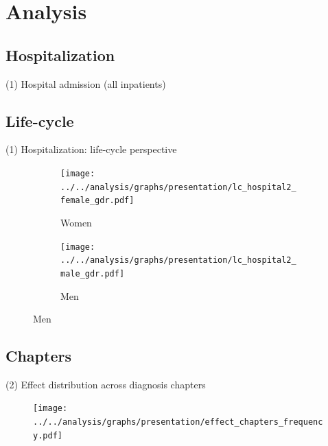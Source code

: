 \documentclass[aspectratio=169,handout]{beamer} %
\begin{document}
\section{Analysis}

\subsection{Hospitalization}
\begin{frame}{(1) Hospital admission (all inpatients)}\label{HOSPITAL_TAB_TOTAL}
	\tiny
	
	\hyperlink{HOSPITAL_TAB_WOMEN}{}
\end{frame}

 

\subsection{Life-cycle}
\begin{frame}{(1) Hospitalization: life-cycle perspective}
\vspace{1 em}
\vspace{-0.7 em}
\begin{figure}\centering
\begin{subfigure}[h]{0.49\linewidth}\centering\caption{Women}
	\texttt{[image: ../../analysis/graphs/presentation/lc\_hospital2\_female\_gdr.pdf]}
\end{subfigure}
\begin{subfigure}[h]{0.49\linewidth}\centering\caption{Men}
	\texttt{[image: ../../analysis/graphs/presentation/lc\_hospital2\_male\_gdr.pdf]}
\end{subfigure}
\end{figure}
\end{frame}
\subsection{Chapters}\label{CHAPTERS_TOTAL}
\begin{frame}{(2) Effect distribution across diagnosis chapters}
	\begin{figure}\centering
		\texttt{[image: ../../analysis/graphs/presentation/effect\_chapters\_frequency.pdf]}
	\end{figure}
	\hyperlink{CHAPTERS_FEMALE}{}
\end{frame}
\end{document}
